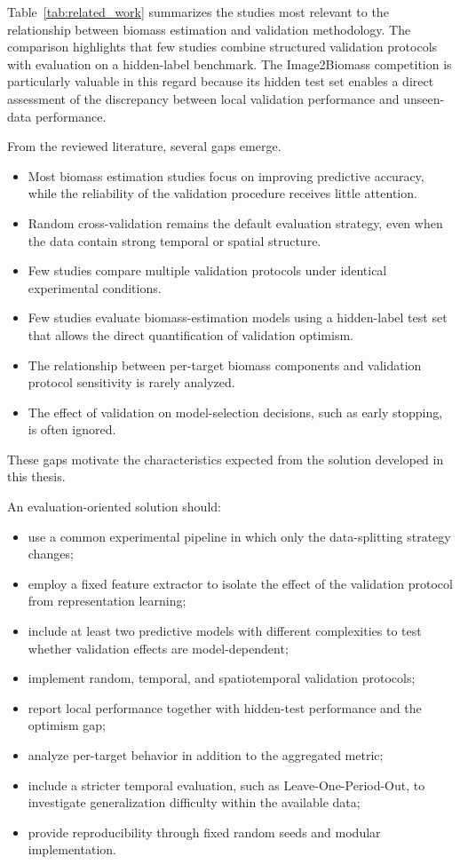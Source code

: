 Table~\ref{tab:related_work} summarizes the studies most relevant to the relationship between biomass estimation and validation methodology. The comparison highlights that few studies combine structured validation protocols with evaluation on a hidden-label benchmark. The Image2Biomass competition is particularly valuable in this regard because its hidden test set enables a direct assessment of the discrepancy between local validation performance and unseen-data performance.

From the reviewed literature, several gaps emerge.

\begin{itemize}
    \item Most biomass estimation studies focus on improving predictive accuracy, while the reliability of the validation procedure receives little attention.
    \item Random cross-validation remains the default evaluation strategy, even when the data contain strong temporal or spatial structure.
    \item Few studies compare multiple validation protocols under identical experimental conditions.
    \item Few studies evaluate biomass-estimation models using a hidden-label test set that allows the direct quantification of validation optimism.
    \item The relationship between per-target biomass components and validation protocol sensitivity is rarely analyzed.
    \item The effect of validation on model-selection decisions, such as early stopping, is often ignored.
\end{itemize}

These gaps motivate the characteristics expected from the solution developed in this thesis.

An evaluation-oriented solution should:

\begin{itemize}
    \item use a common experimental pipeline in which only the data-splitting strategy changes;
    \item employ a fixed feature extractor to isolate the effect of the validation protocol from representation learning;
    \item include at least two predictive models with different complexities to test whether validation effects are model-dependent;
    \item implement random, temporal, and spatiotemporal validation protocols;
    \item report local performance together with hidden-test performance and the optimism gap;
    \item analyze per-target behavior in addition to the aggregated metric;
    \item include a stricter temporal evaluation, such as Leave-One-Period-Out, to investigate generalization difficulty within the available data;
    \item provide reproducibility through fixed random seeds and modular implementation.
\end{itemize}

